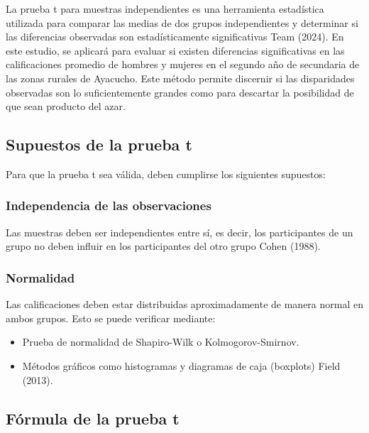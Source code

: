\documentclass[
]{article}
\begin{document}
La prueba t para muestras independientes es una herramienta estadística
utilizada para comparar las medias de dos grupos independientes y
determinar si las diferencias observadas son estadísticamente
significativas Team (2024). En este estudio, se aplicará para evaluar si
existen diferencias significativas en las calificaciones promedio de
hombres y mujeres en el segundo año de secundaria de las zonas rurales
de Ayacucho. Este método permite discernir si las disparidades
observadas son lo suficientemente grandes como para descartar la
posibilidad de que sean producto del azar.

\vspace{0.5cm}

\subsection*{Supuestos de la prueba t}\label{supuestos-de-la-prueba-t}

Para que la prueba t sea válida, deben cumplirse los siguientes
supuestos:

\subsubsection*{Independencia de las
observaciones}\label{independencia-de-las-observaciones}

Las muestras deben ser independientes entre sí, es decir, los
participantes de un grupo no deben influir en los participantes del otro
grupo Cohen (1988).

\subsubsection*{Normalidad}\label{normalidad}

Las calificaciones deben estar distribuidas aproximadamente de manera
normal en ambos grupos. Esto se puede verificar mediante:

\begin{itemize}
\item
  Prueba de normalidad de Shapiro-Wilk o Kolmogorov-Smirnov.
\item
  Métodos gráficos como histogramas y diagramas de caja (boxplots) Field
  (2013).
\end{itemize}

\subsection*{Fórmula de la prueba t}\label{fuxf3rmula-de-la-prueba-t}
\end{document}
